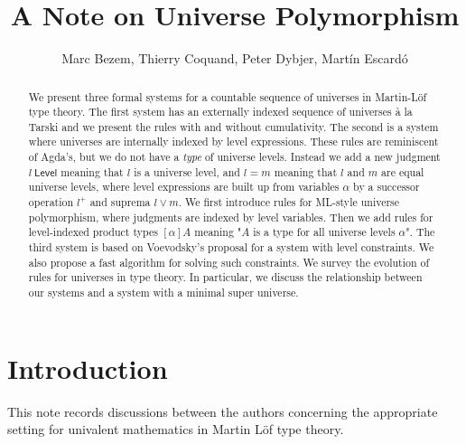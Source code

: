 \documentclass[11pt,a4paper]{article}
\def\Level{\mathsf{Level}}
\begin{document}
\title{A Note on Universe Polymorphism}

\author{Marc Bezem, Thierry Coquand, Peter Dybjer, Mart\'in Escard\'o}
\date{}
\maketitle

\begin{abstract}
We present three formal systems for a countable sequence of universes in Martin-Löf type theory. The first system has an externally indexed sequence of universes \`a la Tarski and we present the rules with and without cumulativity. The second is a system where universes are internally indexed by level expressions. These rules are reminiscent of Agda's, but we do not have a {\em type} of universe levels. Instead we add a new judgment $l\ \Level$ meaning that $l$ is a universe level, and $l = m$ meaning that $l$ and $m$ are equal universe levels, where level expressions are built up from variables $\alpha$ by a successor operation $l^+$ and suprema $l \vee m$. We first introduce rules for ML-style universe polymorphism, where judgments are indexed by level variables. Then we add rules for level-indexed product types $[\alpha]A$ meaning "$A$ is a type for all universe levels $\alpha$". The third system is based on Voevodsky's proposal for a system with level constraints. We also propose a fast algorithm for solving such constraints. We survey the evolution of rules for universes in type theory. In particular, we discuss the relationship between our systems and a system with a minimal super universe.
\end{abstract}

\section{Introduction}

This note records discussions between the authors concerning the appropriate setting for univalent mathematics in Martin Löf type theory.
\end{document}
